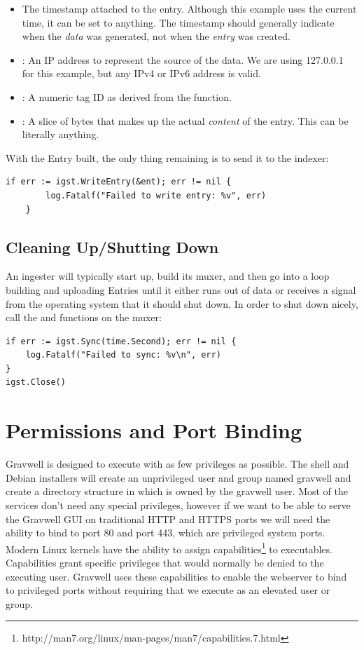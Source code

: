 \begin{itemize}
\item
   The timestamp attached to the entry. Although this example uses
  the current time, it can be set to anything. The timestamp should generally indicate when
  the \emph{data} was generated, not when the \emph{entry} was created.
\item
  : An IP address to represent the source of the data. We are using
  127.0.0.1 for this example, but any IPv4 or IPv6 address is valid.
\item
  : A numeric tag ID as derived from the  function.
\item
  : A slice of bytes that makes up the actual \emph{content} of the
  entry. This can be literally anything.
\end{itemize}

With the Entry built, the only thing remaining is to send it to the
indexer:

\begin{Verbatim}[breaklines=true]
    if err := igst.WriteEntry(&ent); err != nil {
        log.Fatalf("Failed to write entry: %v", err)
    }
\end{Verbatim}

\subsection{Cleaning Up/Shutting Down}

An ingester will typically start up, build its muxer, and then go into
a loop building and uploading Entries until it either runs out of data
or receives a signal from the operating system that it should shut down.
In order to shut down nicely, call the  and  functions on the
muxer:

\begin{Verbatim}[breaklines=true]
if err := igst.Sync(time.Second); err != nil {
    log.Fatalf("Failed to sync: %v\n", err)
}
igst.Close()
\end{Verbatim}



\section{Permissions and Port Binding}

Gravwell is designed to execute with as few privileges as possible.
The shell and Debian installers will create an unprivileged user and
group named gravwell and create a directory structure in
 which is owned by the gravwell user.
Most of the services don't need any special privileges, however
if we want to be able to serve the Gravwell GUI on traditional HTTP and
HTTPS ports we will need the ability to bind to port 80 and port 443,
which are privileged system ports. Modern Linux kernels have the
ability to assign
capabilities\footnote{http://man7.org/linux/man-pages/man7/capabilities.7.html} to
executables. Capabilities grant specific privileges that would normally be 
denied to the executing user. Gravwell uses these capabilities to enable the
webserver to bind to privileged ports without requiring that we execute
as an elevated user or group.

